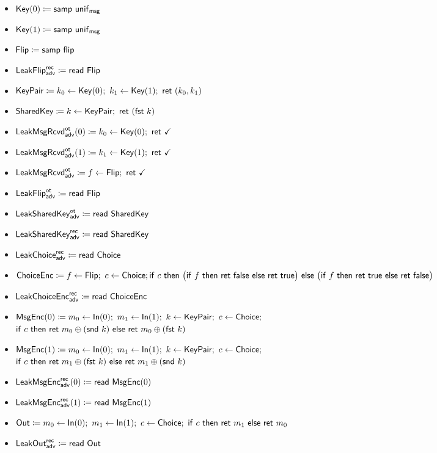 \begin{itemize}
\item $\mathsf{Key}(0) \coloneqq \mathsf{samp} \ \mathsf{unif}_{\mathsf{msg}}$
\item $\mathsf{Key}(1) \coloneqq \mathsf{samp} \ \mathsf{unif}_{\mathsf{msg}}$
\item $\mathsf{Flip} \coloneqq \mathsf{samp} \ \mathsf{flip}$
\item {\color{blue} $\mathsf{LeakFlip}^{\mathsf{rec}}_{\mathsf{adv}} \coloneqq \mathsf{read} \ \mathsf{Flip}$}
\item {\color{red} $\KeyPair \coloneqq k_0 \leftarrow \Key(0); \ k_1 \leftarrow \Key(1); \ \ret{(k_0,k_1)}$}
\item $\mathsf{SharedKey} \coloneqq k \leftarrow \mathsf{KeyPair}; \ \mathsf{ret} \ (\mathsf{fst} \ k)$
\item {\color{blue} $\LeakKeyRcvd^\ot_\adv(0) \coloneqq k_0 \leftarrow \Key(0); \ \ret{\checkmark}$}
\item {\color{blue} $\LeakKeyRcvd^\ot_\adv(1) \coloneqq k_1 \leftarrow \Key(1); \ \ret{\checkmark}$}
\item {\color{blue} $\mathsf{LeakMsgRcvd}^{\mathsf{ot}}_{\mathsf{adv}} \coloneqq f \leftarrow \mathsf{Flip}; \ \mathsf{ret} \ \checkmark$}
\item {\color{blue} $\mathsf{LeakFlip}^{\mathsf{ot}}_{\mathsf{adv}} \coloneqq \mathsf{read} \ \mathsf{Flip}$}
\item {\color{blue} $\mathsf{LeakSharedKey}^{\mathsf{ot}}_{\mathsf{adv}} \coloneqq \mathsf{read} \ \mathsf{SharedKey}$}
\item {\color{blue} $\mathsf{LeakSharedKey}^{\mathsf{rec}}_{\mathsf{adv}} \coloneqq \mathsf{read} \ \mathsf{SharedKey}$}
\item {\color{blue} $\mathsf{LeakChoice}^{\mathsf{rec}}_{\mathsf{adv}} \coloneqq \mathsf{read} \ \mathsf{Choice}$}
\item $\mathsf{ChoiceEnc} \coloneqq f \leftarrow \mathsf{Flip}; \ c \leftarrow \mathsf{Choice}; \\ \mathsf{if} \ c \ \mathsf{then} \ \big(\mathsf{if} \ f \ \mathsf{then} \ \mathsf{ret} \ \mathsf{false} \ \mathsf{else} \ \mathsf{ret} \ \mathsf{true}\big) \ \mathsf{else} \ \big(\mathsf{if} \ f \ \mathsf{then} \ \mathsf{ret} \ \mathsf{true} \ \mathsf{else} \ \mathsf{ret} \ \mathsf{false}\big)$
\item {\color{blue} $\mathsf{LeakChoiceEnc}^{\mathsf{rec}}_{\mathsf{adv}} \coloneqq \mathsf{read} \ \mathsf{ChoiceEnc}$}
\item $\mathsf{MsgEnc}(0) \coloneqq m_0 \leftarrow \mathsf{In}(0); \ m_1 \leftarrow \mathsf{In}(1); \ k \leftarrow \mathsf{KeyPair}; \ c \leftarrow \mathsf{Choice};$ \\ $\ifte{c}{\ret{m_0 \oplus (\snd \ k)}}{\ret{m_0 \oplus (\fst \ k)}}$
\item $\mathsf{MsgEnc}(1) \coloneqq m_0 \leftarrow \mathsf{In}(0); \ m_1 \leftarrow \mathsf{In}(1); \ k \leftarrow \mathsf{KeyPair}; \ c \leftarrow \mathsf{Choice};$ \\ $\ifte{c}{\ret{m_1 \oplus (\fst \ k)}}{\ret{m_1 \oplus (\snd \ k)}}$
\item {\color{blue} $\mathsf{LeakMsgEnc}^{\mathsf{rec}}_{\mathsf{adv}}(0) \coloneqq \mathsf{read} \ \mathsf{MsgEnc}(0)$}
\item {\color{blue} $\mathsf{LeakMsgEnc}^{\mathsf{rec}}_{\mathsf{adv}}(1) \coloneqq \mathsf{read} \ \mathsf{MsgEnc}(1)$}
\item $\Out \coloneqq m_0 \leftarrow \In(0); \ m_1 \leftarrow \In(1); \ c \leftarrow \Choice; \ \ifte{c}{\ret{m_1}}{\ret{m_0}}$
\item {\color{blue} $\mathsf{LeakOut}^{\mathsf{rec}}_{\mathsf{adv}} \coloneqq \mathsf{read} \ \mathsf{Out}$}
\end{itemize}

